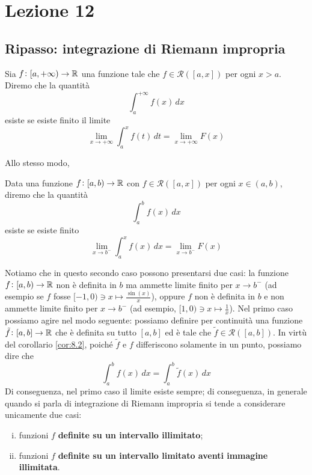 \section{Lezione 12}
\subsection{Ripasso: integrazione di Riemann impropria}
\begin{definition}
    \label{def:10.1}
    Sia $f\colon[a,+\infty)\to \amsbb{R}$ una funzione tale che $f\in\mathscr{R}([a,x])$ per ogni $x>a$. Diremo che la quantità
    \[
    \int_a^{+\infty} f(x)\, dx
    \]
    esiste se esiste finito il limite
    \[
    \lim_{x\to +\infty} \int_a^x f(t)\, dt = \lim_{x\to+\infty} F(x)
    \]
\end{definition}
Allo stesso modo, 
\begin{definition}
    \label{def:10.2}
    Data una funzione $f\colon [a,b)\to\amsbb{R}$ con $f\in\mathscr{R}([a,x])$ per ogni $x\in(a,b)$, diremo che la quantità
    \[
    \int_a^b f(x)\, dx
    \]
    esiste se esiste finito
    \[
    \lim_{x\to b^-} \int_a^x f(x)\, dx = \lim_{x\to b^-} F(x)
    \]
\end{definition}
\begin{remark}
    Notiamo che in questo secondo caso possono presentarsi due casi: la funzione $f\colon[a,b)\to\amsbb{R}$ non è definita in $b$ ma ammette limite finito per $x\to b^-$ (ad esempio se $f$ fosse $[-1, 0)\ni x\mapsto \frac{\sin(x)}{x}$), oppure $f$ non è definita in $b$ e non ammette limite finito per $x\to b^-$ (ad esempio, $[1,0)\ni x\mapsto \frac{1}{x}$). Nel primo caso possiamo agire nel modo seguente: possiamo definire per continuità una funzione $\tilde{f}\colon[a,b]\to \amsbb{R}$ che è definita su tutto $[a,b]$ ed è tale che $\tilde{f}\in\mathscr{R}([a,b])$. In virtù del corollario \ref{cor:8.2}, poiché $\tilde{f}$ e $f$ differiscono solamente in un punto, possiamo dire che
    \[
    \int_a^b f(x)\, dx = \int_a^b \tilde{f}(x)\, dx
    \]
    Di conseguenza, nel primo caso il limite esiste sempre; di conseguenza, in generale quando si parla di integrazione di Riemann impropria si tende a considerare unicamente due casi:
    \begin{enumerate}[(i)]
        \item funzioni $f$ \textbf{definite su un intervallo illimitato};
        \item funzioni $f$ \textbf{definite su un intervallo limitato aventi immagine illimitata}.
    \end{enumerate}
\end{remark}
